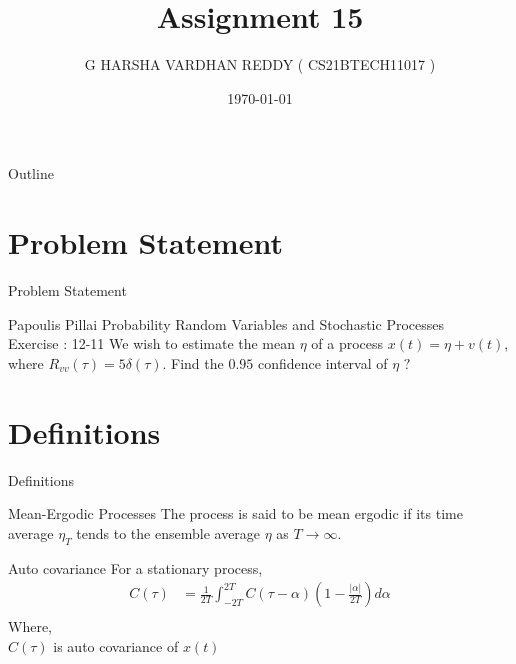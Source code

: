 \documentclass{beamer}
\title{Assignment 15}
\author[CS21BTECH11017]{G HARSHA VARDHAN REDDY ( CS21BTECH11017 )}
\date{\today}
\begin{document}
\begin{frame}
    \titlepage 
\end{frame}

\logo{}


\begin{frame}{Outline}
    \tableofcontents
\end{frame}

\section{Problem Statement}
\begin{frame}{Problem Statement}
    \begin{block} {Papoulis Pillai Probability Random Variables and Stochastic Processes\\ 
    Exercise : 12-11}
    We wish to estimate the mean $\eta$ of a process $x(t) =\eta + v(t)$, where $R_{vv}(\tau) = 5\delta(\tau)$. Find the $0.95$ confidence interval of $\eta$ $?$ 
    \end{block}
\end{frame}
\section{Definitions}
\begin{frame}{Definitions}
    \begin{block}{Mean-Ergodic Processes}
The process is said to be mean ergodic if its time average $\eta_T$ tends
to the ensemble average $\eta$ as $T \to \infty$. 
    \end{block}
    \begin{block}{Auto covariance}
    For a stationary process,
    \begin{align}
        C(\tau) &= \frac{1}{2T}\int^{2T}_{-2T}C(\tau -\alpha)\left( 1-\frac{|\alpha|}{2T}\right)d\alpha \label{a}\\
    \end{align}
    Where,\\
    $C(\tau)$ is auto covariance of $x(t)$ 
    \end{block}
\end{frame}
\end{document}
